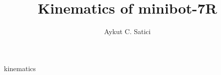 \documentclass[journal,twoside,web]{ieeecolor}
\begin{document}
\title{Kinematics of minibot-7R} 
\author{
Aykut C. Satici  %
}
\maketitle


\begin{IEEEkeywords}
    kinematics
\end{IEEEkeywords}






        
  



%         
%   
\end{document}
